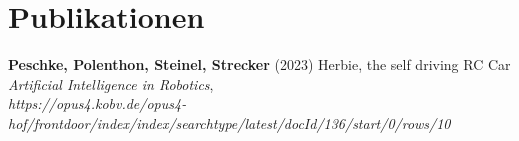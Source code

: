 \section{Publikationen}\label{sec: publikationen}

\textbf{Peschke, Polenthon, Steinel, Strecker}
(2023) Herbie, the self driving RC Car \textit{Artificial Intelligence in Robotics},\\
\textit{https://opus4.kobv.de/opus4-hof/frontdoor/index/index/\newline searchtype/latest/docId/136/start/0/rows/10}